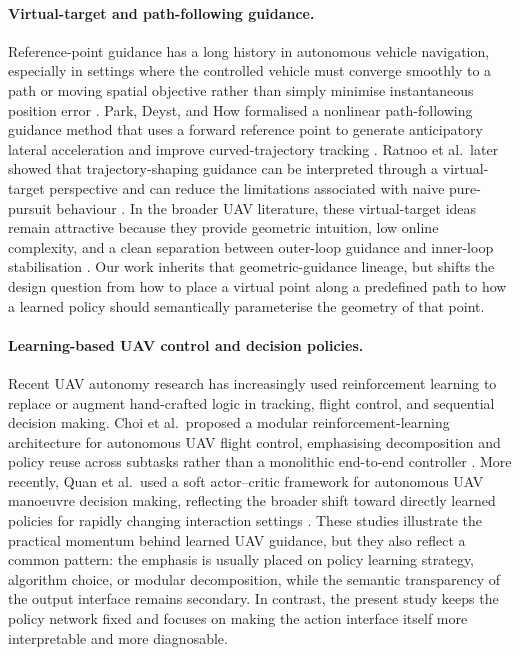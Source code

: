 \documentclass[drones,article,submit,pdftex,moreauthors]{Definitions/mdpi}
\begin{document}
\paragraph{Virtual-target and path-following guidance.}
Reference-point guidance has a long history in autonomous vehicle navigation, especially in settings where the controlled vehicle must converge smoothly to a path or moving spatial objective rather than simply minimise instantaneous position error \cite{sujit2014}. Park, Deyst, and How formalised a nonlinear path-following guidance method that uses a forward reference point to generate anticipatory lateral acceleration and improve curved-trajectory tracking \cite{park2007}. Ratnoo et al.\ later showed that trajectory-shaping guidance can be interpreted through a virtual-target perspective and can reduce the limitations associated with naive pure-pursuit behaviour \cite{ratnoo2015}. In the broader UAV literature, these virtual-target ideas remain attractive because they provide geometric intuition, low online complexity, and a clean separation between outer-loop guidance and inner-loop stabilisation \cite{elmokadem2021,rhee2010}. Our work inherits that geometric-guidance lineage, but shifts the design question from how to place a virtual point along a predefined path to how a learned policy should semantically parameterise the geometry of that point.

\paragraph{Learning-based UAV control and decision policies.}
Recent UAV autonomy research has increasingly used reinforcement learning to replace or augment hand-crafted logic in tracking, flight control, and sequential decision making. Choi et al.\ proposed a modular reinforcement-learning architecture for autonomous UAV flight control, emphasising decomposition and policy reuse across subtasks rather than a monolithic end-to-end controller \cite{choi2023,jing2024aerospace}. More recently, Quan et al.\ used a soft actor--critic framework for autonomous UAV manoeuvre decision making, reflecting the broader shift toward directly learned policies for rapidly changing interaction settings \cite{quan2026,haarnoja2018}. These studies illustrate the practical momentum behind learned UAV guidance, but they also reflect a common pattern: the emphasis is usually placed on policy learning strategy, algorithm choice, or modular decomposition, while the semantic transparency of the output interface remains secondary. In contrast, the present study keeps the policy network fixed and focuses on making the action interface itself more interpretable and more diagnosable.
\end{document}
